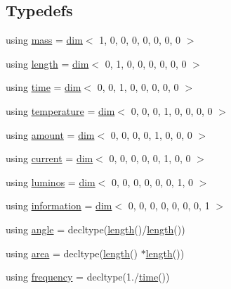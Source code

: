 \subsection*{Typedefs}
\begin{DoxyCompactItemize}
\item 
using \hyperlink{namespacemui_1_1dim_a7b17424f4316e37d7970ee09857ccddf}{mass} = \hyperlink{structmui_1_1dim_1_1dim}{dim}$<$ 1, 0, 0, 0, 0, 0, 0, 0 $>$
\item 
using \hyperlink{namespacemui_1_1dim_ade9a9679bc46e16322ef419974faebe6}{length} = \hyperlink{structmui_1_1dim_1_1dim}{dim}$<$ 0, 1, 0, 0, 0, 0, 0, 0 $>$
\item 
using \hyperlink{namespacemui_1_1dim_a3d3a0014025f1c2c0dd7418791928500}{time} = \hyperlink{structmui_1_1dim_1_1dim}{dim}$<$ 0, 0, 1, 0, 0, 0, 0, 0 $>$
\item 
using \hyperlink{namespacemui_1_1dim_a3d9b1e07165d3ef9a3d9213035e05d8e}{temperature} = \hyperlink{structmui_1_1dim_1_1dim}{dim}$<$ 0, 0, 0, 1, 0, 0, 0, 0 $>$
\item 
using \hyperlink{namespacemui_1_1dim_a00ff3f13d3bd0f4564227904373dc3eb}{amount} = \hyperlink{structmui_1_1dim_1_1dim}{dim}$<$ 0, 0, 0, 0, 1, 0, 0, 0 $>$
\item 
using \hyperlink{namespacemui_1_1dim_ac15a72100f3e57d6c9419fca5501b456}{current} = \hyperlink{structmui_1_1dim_1_1dim}{dim}$<$ 0, 0, 0, 0, 0, 1, 0, 0 $>$
\item 
using \hyperlink{namespacemui_1_1dim_aaa6d47b51b672a8e7b7c549d6a437977}{luminos} = \hyperlink{structmui_1_1dim_1_1dim}{dim}$<$ 0, 0, 0, 0, 0, 0, 1, 0 $>$
\item 
using \hyperlink{namespacemui_1_1dim_abee516dc27b7ef30e706ffc9ce0ea363}{information} = \hyperlink{structmui_1_1dim_1_1dim}{dim}$<$ 0, 0, 0, 0, 0, 0, 0, 1 $>$
\item 
using \hyperlink{namespacemui_1_1dim_a967db7ab1d1127cdb94fe084e592d1e0}{angle} = decltype(\hyperlink{namespacemui_1_1dim_ade9a9679bc46e16322ef419974faebe6}{length}()/\hyperlink{namespacemui_1_1dim_ade9a9679bc46e16322ef419974faebe6}{length}())
\item 
using \hyperlink{namespacemui_1_1dim_aedf0a30e04c732a032fe7e04d3260ee3}{area} = decltype(\hyperlink{namespacemui_1_1dim_ade9a9679bc46e16322ef419974faebe6}{length}() $\ast$\hyperlink{namespacemui_1_1dim_ade9a9679bc46e16322ef419974faebe6}{length}())
\item 
using \hyperlink{namespacemui_1_1dim_a2b1533b4a87cb5275032e7279211e793}{frequency} = decltype(1./\hyperlink{namespacemui_1_1dim_a3d3a0014025f1c2c0dd7418791928500}{time}())

\end{DoxyCompactItemize}
